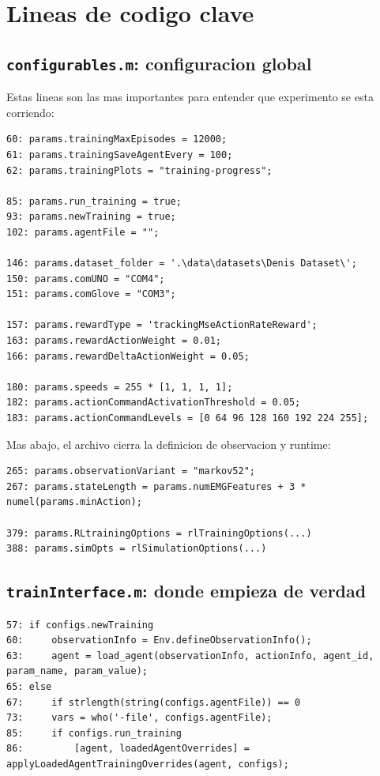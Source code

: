 \documentclass[11pt,a4paper]{article}
\begin{document}
\section{Lineas de codigo clave}

\subsection{\texttt{configurables.m}: configuracion global}

Estas lineas son las mas importantes para entender que experimento se esta corriendo:

\begin{lstlisting}
60: params.trainingMaxEpisodes = 12000;
61: params.trainingSaveAgentEvery = 100;
62: params.trainingPlots = "training-progress";

85: params.run_training = true;
93: params.newTraining = true;
102: params.agentFile = "";

146: params.dataset_folder = '.\data\datasets\Denis Dataset\';
150: params.comUNO = "COM4";
151: params.comGlove = "COM3";

157: params.rewardType = 'trackingMseActionRateReward';
163: params.rewardActionWeight = 0.01;
166: params.rewardDeltaActionWeight = 0.05;

180: params.speeds = 255 * [1, 1, 1, 1];
182: params.actionCommandActivationThreshold = 0.05;
183: params.actionCommandLevels = [0 64 96 128 160 192 224 255];
\end{lstlisting}

Mas abajo, el archivo cierra la definicion de observacion y runtime:

\begin{lstlisting}
265: params.observationVariant = "markov52";
267: params.stateLength = params.numEMGFeatures + 3 * numel(params.minAction);

379: params.RLtrainingOptions = rlTrainingOptions(...)
388: params.simOpts = rlSimulationOptions(...)
\end{lstlisting}

\subsection{\texttt{trainInterface.m}: donde empieza de verdad}

\begin{lstlisting}
57: if configs.newTraining
60:     observationInfo = Env.defineObservationInfo();
63:     agent = load_agent(observationInfo, actionInfo, agent_id, param_name, param_value);
65: else
67:     if strlength(string(configs.agentFile)) == 0
73:     vars = who('-file', configs.agentFile);
85:     if configs.run_training
86:         [agent, loadedAgentOverrides] = applyLoadedAgentTrainingOverrides(agent, configs);
\end{lstlisting}
\end{document}
